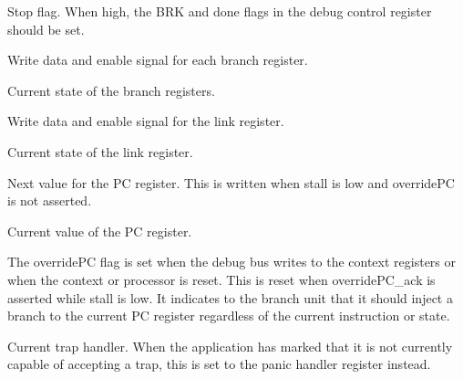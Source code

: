 \ifaceSubGroup{}
Stop flag. When high, the BRK and done flags in the debug control
register should be set.
    
\ifaceSubGroup{}
Write data and enable signal for each branch register.
    
\ifaceSubGroup{}
Current state of the branch registers.
    
\ifaceSubGroup{}
Write data and enable signal for the link register.
    
\ifaceSubGroup{}
Current state of the link register.

\ifaceSubGroup{}
Next value for the PC register. This is written when stall is low and overridePC 
is not asserted.

\ifaceSubGroup{}
Current value of the PC register.

\ifaceSubGroup{}
The overridePC flag is set when the debug bus writes to the context registers or 
when the context or processor is reset. This is reset when overridePC_ack is 
asserted while stall is low. It indicates to the branch unit that it should 
inject a branch to the current PC register regardless of the current instruction 
or state.

\ifaceSubGroup{}
Current trap handler. When the application has marked that it is not currently 
capable of accepting a trap, this is set to the panic handler register instead.

